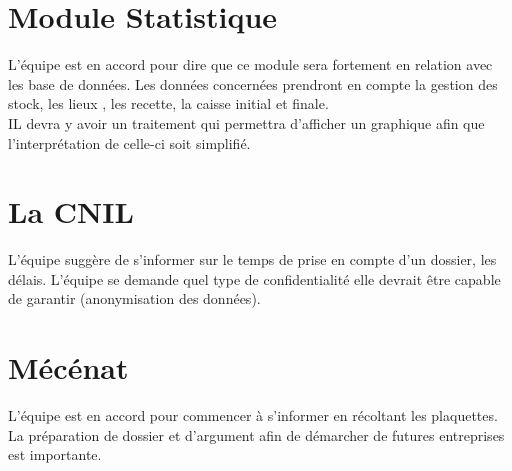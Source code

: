 \documentclass [a4paper] {article}
\begin{document}
\section{Module Statistique}
L'équipe est en accord pour dire que ce module sera fortement en relation avec les base de données. Les données concernées prendront en compte la gestion des stock, les lieux , les recette, la caisse initial et finale. \\
IL devra y avoir un traitement  qui permettra d'afficher un graphique afin que l'interprétation de celle-ci soit simplifié.

\section{La CNIL}
L'équipe suggère de s'informer sur le temps de prise en compte d'un dossier, les délais. L'équipe se demande quel type de confidentialité elle devrait être capable de garantir (anonymisation des données).
\\

\section{Mécénat}

L'équipe est en accord pour commencer à s'informer en récoltant les plaquettes. La préparation de dossier et d'argument afin de démarcher de futures entreprises est importante.

\end{document}
